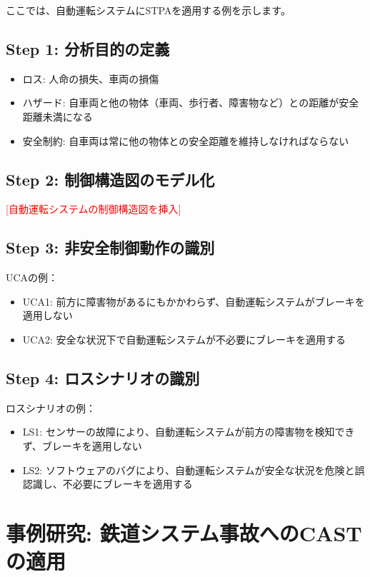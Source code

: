 ここでは、自動運転システムにSTPAを適用する例を示します。

\subsection{Step 1: 分析目的の定義}

\begin{itemize}
    \item ロス: 人命の損失、車両の損傷
    \item ハザード: 自車両と他の物体（車両、歩行者、障害物など）との距離が安全距離未満になる
    \item 安全制約: 自車両は常に他の物体との安全距離を維持しなければならない
\end{itemize}

\subsection{Step 2: 制御構造図のモデル化}

\textcolor{red}{[自動運転システムの制御構造図を挿入]}

\subsection{Step 3: 非安全制御動作の識別}

UCAの例：
\begin{itemize}
    \item UCA1: 前方に障害物があるにもかかわらず、自動運転システムがブレーキを適用しない
    \item UCA2: 安全な状況下で自動運転システムが不必要にブレーキを適用する
\end{itemize}

\subsection{Step 4: ロスシナリオの識別}

ロスシナリオの例：
\begin{itemize}
    \item LS1: センサーの故障により、自動運転システムが前方の障害物を検知できず、ブレーキを適用しない
    \item LS2: ソフトウェアのバグにより、自動運転システムが安全な状況を危険と誤認識し、不必要にブレーキを適用する
\end{itemize}

\section{事例研究: 鉄道システム事故へのCASTの適用}

